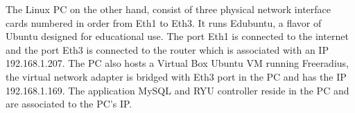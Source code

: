 The Linux PC on the other hand, consist of three physical network interface cards numbered in order from Eth1 to Eth3. It runs Edubuntu, a flavor of Ubuntu designed for educational use. The port Eth1 is connected to the internet and the port Eth3 is connected to the router which is associated with an IP 192.168.1.207. The PC also hosts a Virtual Box Ubuntu VM running Freeradius, the virtual network adapter is bridged with Eth3 port in the PC and has the IP 192.168.1.169. The application MySQL and RYU controller reside in the PC and are associated to the PC’s IP.
%	


